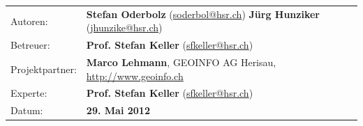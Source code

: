 \begin{titlepage}
\begin{tabular}{p{0.19\twocelltabwidth}p{0.81\twocelltabwidth}}
Autoren: & \textbf{Stefan Oderbolz} (\url{soderbol@hsr.ch}) \newline
 \textbf{Jürg Hunziker} (\url{jhunzike@hsr.ch}) \\ 
Betreuer: & \textbf{Prof. Stefan Keller} (\url{sfkeller@hsr.ch}) \\ 
Projektpartner: & \textbf{Marco Lehmann}, GEOINFO AG Herisau, \url{http://www.geoinfo.ch} \\ 
Experte: & \textbf{Prof. Stefan Keller} (\url{sfkeller@hsr.ch}) \\ 
Datum: & \textbf{29. Mai 2012} \\ 
\end{tabular}

\end{titlepage}